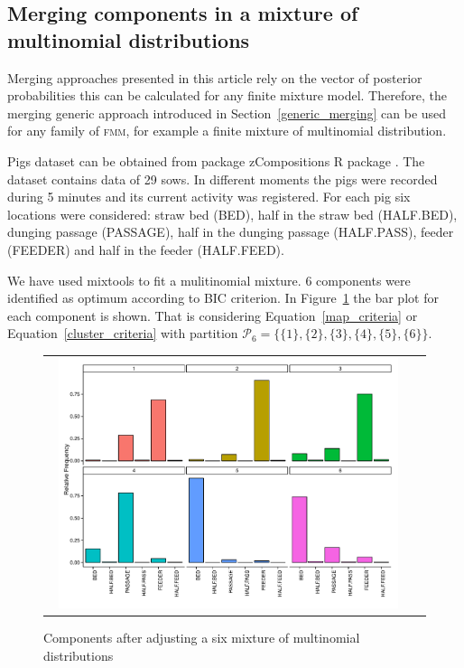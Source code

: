 \documentclass[submit]{smj}
\theoremstyle{definition}
\newcommand{\fmm}{\textsc{fmm}\xspace}
\newcommand{\pkg}[1]{{\fontseries{b}\selectfont #1}}
\begin{document}
\subsection{Merging components in a mixture of multinomial distributions}

Merging approaches presented in this article rely on the vector of posterior probabilities this can be calculated for any finite mixture model. Therefore, the merging generic approach introduced in Section~\ref{generic_merging} can be used for any family of \fmm, for example a finite mixture of multinomial distribution.

Pigs dataset can be obtained from package \pkg{zCompositions} R package \citep{palarea2012zcompositions}. The dataset contains data of 29 sows. In different moments the pigs were recorded during 5 minutes and its current activity was registered. For each pig six locations were considered: straw bed (BED), half in the straw bed (HALF.BED), dunging passage (PASSAGE), half in the dunging passage (HALF.PASS), feeder (FEEDER) and half in the feeder (HALF.FEED).

We have used \pkg{mixtools} \citep{benaglia2009mixtools} to fit a mulitinomial mixture. 6 components were identified as optimum according to BIC criterion. In Figure~\ref{multinomial_mixture} the bar plot for each component is shown. That is considering Equation~\ref{map_criteria} or Equation~\ref{cluster_criteria} with partition $\mathcal{P}_6 = \{\{1\}, \{2\}, \{3\}, \{4\}, \{5\}, \{6\}\}$.

\begin{figure}[t]
\begin{center}
\begin{tabular}{cc}
  \includegraphics[width=0.95\textwidth]{figures/multinomial_mixt_all.pdf} \\
 \end{tabular}
 \caption{Components after adjusting a six mixture of multinomial distributions}\label{multinomial_mixture}
\end{center}
\end{figure}
\end{document}
